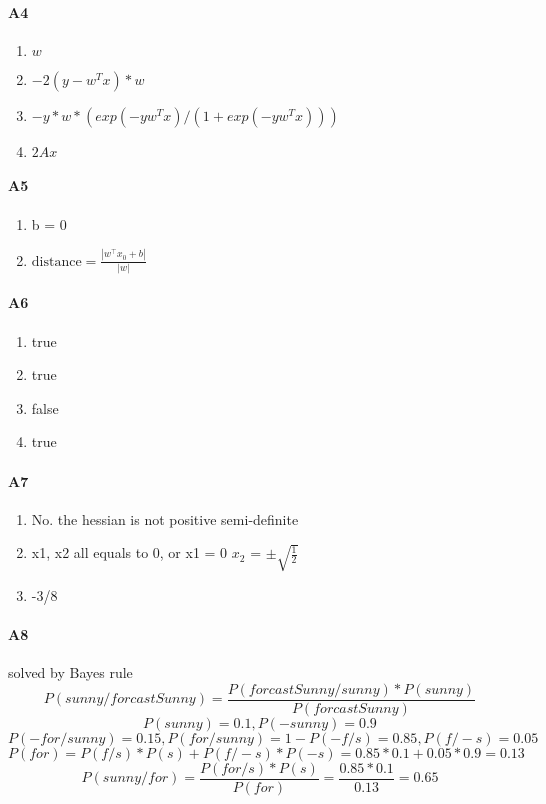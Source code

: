 \documentclass[11pt]{article}
\begin{document}
\paragraph{A4} 
\begin{enumerate} 
    \item $w$
    \item $-2(y - w^T x) * w$
    \item $ -y * w * ( exp(-yw^T x) / (1 + exp(-yw^T x)) )$
    \item $2Ax$
\end{enumerate}

\paragraph{A5}
\begin{enumerate}
    \item b = 0
    \item $\text{distance} = \frac{|w^\intercal x_0 + b|}{\left|w\right|}$
\end{enumerate}

\paragraph{A6} 
\begin{enumerate}
    \item true
    \item true
    \item false
    \item true
\end{enumerate}

\paragraph{A7} 
\begin{enumerate}
    \item No. the hessian is not positive semi-definite
    \item x1, x2 all equals to 0, or x1 = 0 $x_2$ = $\pm \sqrt{\frac{1}{2}}$
    \item -3/8 
\end{enumerate}

\paragraph{A8}

solved by Bayes rule
$$ P(sunny/forcastSunny) = \frac{P(forcastSunny/sunny) * P(sunny)}{P(forcastSunny)} $$
$$ P(sunny) = 0.1, P(-sunny) = 0.9$$
$$P(-for/sunny) = 0.15, P(for/sunny) = 1 - P(-f/s) = 0.85, P(f/-s) = 0.05$$
$$P(for) = P(f/s) * P(s) + P(f/-s) * P(-s) = 0.85 * 0.1 + 0.05 * 0.9 = 0.13$$
$$P(sunny/for) = \frac{P(for/s) * P(s)}{P(for)} = \frac{0.85 * 0.1}{0.13} = 0.65$$
\end{document}
